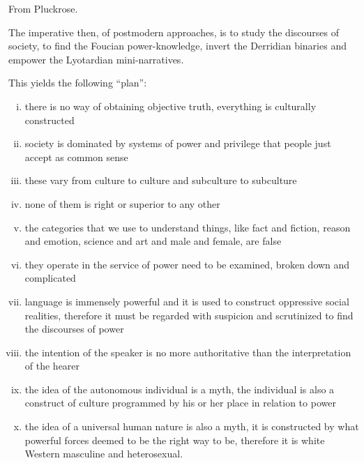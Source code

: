 \documentclass[10pt,titlepage]{article}
\begin{document}
{From Pluckrose\cite{pluckrose-evolution}.


The imperative then, of postmodern approaches, is to study the discourses of society, to find the Foucian power-knowledge, invert the Derridian binaries and empower the Lyotardian mini-narratives.

This yields the following ``plan'':
     \begin{enumerate}[i)]
     \item there is no way of obtaining objective truth, everything is culturally constructed
     \item society is dominated by systems of power and privilege that people just accept as common sense
     \item these vary from culture to culture and subculture to subculture
     \item none of them is right or superior to any other
     \item the categories that we use to understand things, like fact and fiction, reason and emotion, science and art and male and female, are false
     \item they operate in the service of power need to be examined, broken down and complicated
     \item language is immensely powerful and it is used to construct oppressive social realities, therefore it must be regarded with suspicion and scrutinized to find the discourses of power
     \item the intention of the speaker is no more authoritative than the interpretation of the hearer
     \item the idea of the autonomous individual is a myth, the individual is also a construct of culture programmed by his or her place in relation to power
     \item the idea of a universal human nature is also a myth, it is constructed by what
powerful forces deemed to be the right way to be, therefore it is white Western masculine and heterosexual.
     \end{enumerate}


{}



}%

\label{index}
{\twocolumn[]
{\small\printindex}}





\end{document}
